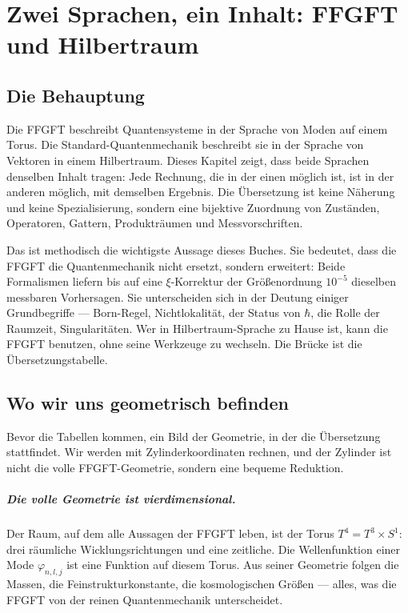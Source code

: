 \chapter{Zwei Sprachen, ein Inhalt: FFGFT und Hilbertraum}
\label{ch:hilbert}

\section{Die Behauptung}

Die FFGFT beschreibt Quantensysteme in der Sprache von Moden auf einem
Torus. Die Standard-Quantenmechanik beschreibt sie in der Sprache von
Vektoren in einem Hilbertraum. Dieses Kapitel zeigt, dass beide Sprachen
denselben Inhalt tragen: Jede Rechnung, die in der einen möglich ist,
ist in der anderen möglich, mit demselben Ergebnis. Die Übersetzung ist
keine Näherung und keine Spezialisierung, sondern eine bijektive
Zuordnung von Zuständen, Operatoren, Gattern, Produkträumen und
Messvorschriften.

Das ist methodisch die wichtigste Aussage dieses Buches. Sie bedeutet,
dass die FFGFT die Quantenmechanik nicht ersetzt, sondern erweitert:
Beide Formalismen liefern bis auf eine $\xi$-Korrektur der Größenordnung
$10^{-5}$ dieselben messbaren Vorhersagen. Sie unterscheiden sich in der
Deutung einiger Grundbegriffe --- Born-Regel, Nichtlokalität, der Status
von $\hbar$, die Rolle der Raumzeit, Singularitäten. Wer in
Hilbertraum-Sprache zu Hause ist, kann die FFGFT benutzen, ohne seine
Werkzeuge zu wechseln. Die Brücke ist die Übersetzungstabelle.

\section{Wo wir uns geometrisch befinden}

Bevor die Tabellen kommen, ein Bild der Geometrie, in der die Übersetzung
stattfindet. Wir werden mit Zylinderkoordinaten rechnen, und der Zylinder
ist nicht die volle FFGFT-Geometrie, sondern eine bequeme Reduktion.

\paragraph{Die volle Geometrie ist vierdimensional.} Der Raum, auf dem
alle Aussagen der FFGFT leben, ist der Torus $T^4 = T^3\times S^1$: drei
räumliche Wicklungsrichtungen und eine zeitliche. Die Wellenfunktion
einer Mode $\varphi_{n,l,j}$ ist eine Funktion auf diesem Torus. Aus
seiner Geometrie folgen die Massen, die Feinstrukturkonstante, die
kosmologischen Größen --- alles, was die FFGFT von der reinen
Quantenmechanik unterscheidet.

